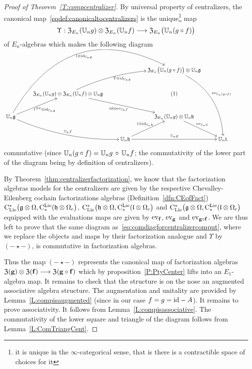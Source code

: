 \documentclass[11pt]{amsart}
\numberwithin{equation}{section}
\begin{document}
\begin{proof}[Proof of Theorem~\ref{T:compcentralizer}]
By universal property of centralizers, the canonical map~\eqref{eqdef:canonicaltocentralizers}  
is the unique\footnote{it is unique in the $\infty$-categorical 
sense, that is there is a contractible space of choices for it} map 
\[ \Upsilon: {\frak Z}_{E_n}(\mathbb U_n g) \otimes {\frak Z}_{E_n}(\mathbb U_n f) \longrightarrow {\frak Z}_{E_n}\big(\mathbb U_n (g\circ f)\big)\] 
of $E_n$-algebras which makes the following diagram
\begin{equation}\label{eq:comdiagforcentralizercomput}\small
 \xymatrix{
&   &&  
{\frak Z}_{E_n}\big(\UU_n (g\circ f) \big) \otimes  \UU_n \fg  \ar@/^{2pc}/[dddr]^{\ev_{\UU_n (g\circ f)}}\\
&{\frak Z}_{E_n}(\UU_n g) \otimes  {\frak Z}_{E_n}(\UU_n f) \otimes \UU_n \fg \ar@/^{1pc}/[rru]_{ \Upsilon \otimes \id_{\UU_n \fg}} \ar[rrd]_{\id\otimes \ev_{\UU_n f}}
&& (1)
& & \\
\UU_n \fg \ar[ur]_{1^{\otimes 2}\otimes \id_{\UU_n \fg}} \ar@/_{1pc}/[rrd]^{\UU_n f} \ar@/^{6pc}/[rrruu]_{1\otimes \id_{\UU_n \fg}} &&&
{\frak Z}_{E_n}(\UU_n g) \otimes \UU_n \fh \ar[rd]^{\ev_{\UU_n h}}  &\\
&& \UU_n \fh \ar[rr]^{\UU_n g} \ar[ur]^{1\otimes \id_{\UU_n \fh}} && \UU_n \fl .}
\end{equation}
commutative (since $\mathbb U_n (g\circ f) = \mathbb U_n g\, \circ \, \mathbb U_n f $;  the commutativity of the lower part of the diagram being by definition of centralizers).

By Theorem~\ref{thm:centralizerfactorization}, we know that the factorization algebras models for the centralizers are given by the respective Chevalley-Eilenberg cochain factorizations algebras 
(Definition~\ref{dfn:CEofFact}) ${\rm C}_{\rm Lie}^*\big(\mathfrak g \otimes \Omega, {\rm C}^{\rm Lie}_*(\mathfrak h \otimes \Omega_c  \big) $, 
${\rm C}_{\rm Lie}^*\big(\mathfrak h \otimes \Omega, {\rm C}^{\rm Lie}_*(\mathfrak l \otimes \Omega_c  \big) $ and ${\rm C}_{\rm Lie}^*\big(\mathfrak g \otimes \Omega, {\rm C}^{\rm Lie}_*(\mathfrak l \otimes \Omega_c  \big) $ 
equipped with the evaluations maps are given by ${\rm ev}_{\mathbf{f}}$, ${\rm ev}_{\mathbf{g}}$ and ${\rm ev}_{\mathbf{g}\circ \mathbf{f}}$. We are thus left 
to prove that the same  diagram as~\eqref{eq:comdiagforcentralizercomput}, where we replace the objects and maps by their factorization analogue and $\Upsilon$
by $(-\star-)$, is commutative in factorization algebras.

Thus the map $(-\star-)$ represents the canonical map of factorization algebras 
$ {\frak Z}(\mathbf{g}) \otimes {\frak Z}(\mathbf{f}) \longrightarrow {\frak Z}(\mathbf{g}\circ \mathbf{f})$ which by proposition~\ref{P:PtyCenter} lifts
into an $E_1$-algebra map. It remains to check that the structure is on the nose an augmented associative algebra structure.
The augmentation and unitality are provided by Lemma~\ref{L:compisaugmented} (since in our case $f=g={\rm id}-A$). 
It remains to prove associativity. It follows from Lemma~\ref{L:compisassociative}. 
The commutativity of the lower square and triangle of the diagram follows from Lemma~\ref{L:ComTriangCent}.
\end{proof}
\end{document}
